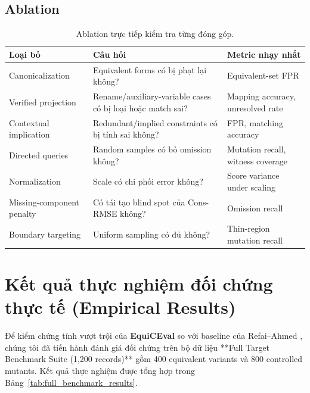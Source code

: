 \documentclass[11pt,a4paper]{article}
\newcommand{\method}{\textsf{\textbf{EquiCEval}}\xspace}
\begin{document}
\subsection{Ablation}

\begin{table}[htbp]
\centering
\caption{Ablation trực tiếp kiểm tra từng đóng góp.}
\small
\begin{tabularx}{\textwidth}{L{3.6cm} Y Y}
\toprule
\textbf{Loại bỏ} & \textbf{Câu hỏi} & \textbf{Metric nhạy nhất} \\
\midrule
Canonicalization & Equivalent forms có bị phạt lại không? & Equivalent-set FPR \\
Verified projection & Rename/auxiliary-variable cases có bị loại hoặc match sai? & Mapping accuracy, unresolved rate \\
Contextual implication & Redundant/implied constraints có bị tính sai không? & FPR, matching accuracy \\
Directed queries & Random samples có bỏ omission không? & Mutation recall, witness coverage \\
Normalization & Scale có chi phối error không? & Score variance under scaling \\
Missing-component penalty & Có tái tạo blind spot của Cons-RMSE không? & Omission recall \\
Boundary targeting & Uniform sampling có đủ không? & Thin-region mutation recall \\
\bottomrule
\end{tabularx}
\end{table}

\section{Kết quả thực nghiệm đối chứng thực tế (Empirical Results)}

Để kiểm chứng tính vượt trội của \method so với baseline của Refai--Ahmed \parencite{refai2025component}, chúng tôi đã tiến hành đánh giá đối chứng trên bộ dữ liệu **Full Target Benchmark Suite (1,200 records)** gồm 400 equivalent variants và 800 controlled mutants. Kết quả thực nghiệm được tổng hợp trong Bảng~\ref{tab:full_benchmark_results}.
\end{document}
